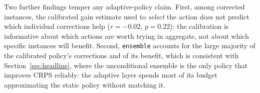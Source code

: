 Two further findings temper any adaptive-policy claim. First, among corrected instances,
the calibrated gain estimate used to \emph{select} the action does not predict which
individual corrections help ($r=-0.02$, $p=0.22$): the calibration is informative about
which actions are worth trying in aggregate, not about which specific instances will
benefit. Second, \texttt{ensemble} accounts for the large majority of the calibrated
policy's corrections and of its benefit, which is consistent with Section~\ref{sec:headline}, where the unconditional ensemble is the only policy that improves CRPS reliably: the adaptive layer spends most of its budget approximating the static policy without matching it.
